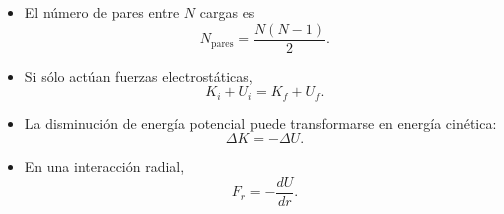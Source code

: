 \begin{resumen}
\begin{itemize}
    \item El número de pares entre \(N\) cargas es
    \[
    \boxed{
    N_{\text{pares}}=\frac{N(N-1)}{2}
    }.
    \]

    \item Si sólo actúan fuerzas electrostáticas,
    \[
    \boxed{K_i+U_i=K_f+U_f}.
    \]

    \item La disminución de energía potencial puede transformarse en energía cinética:
    \[
    \boxed{\Delta K=-\Delta U}.
    \]

    \item En una interacción radial,
    \[
    \boxed{F_r=-\frac{dU}{dr}}.
    \]
\end{itemize}

\end{resumen}